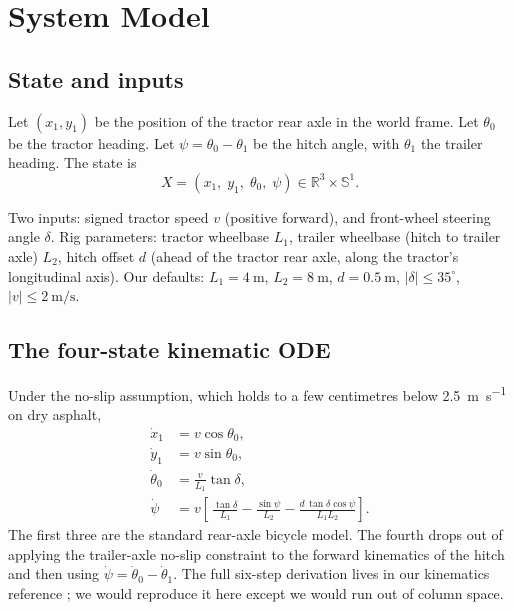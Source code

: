 \documentclass[conference]{IEEEtran}
\begin{document}
\section{System Model}
\label{sec:model}

\subsection{State and inputs}

Let $(x_1, y_1)$ be the position of the tractor rear axle in the world
frame. Let $\theta_0$ be the tractor heading. Let $\psi = \theta_0 -
\theta_1$ be the hitch angle, with $\theta_1$ the trailer heading. The
state is
\begin{equation}
    X = (x_1,\; y_1,\; \theta_0,\; \psi) \in \mathbb{R}^{3} \times \mathbb{S}^{1}.
\end{equation}

Two inputs: signed tractor speed $v$ (positive forward), and front-wheel
steering angle $\delta$. Rig parameters: tractor wheelbase $L_1$, trailer
wheelbase (hitch to trailer axle) $L_2$, hitch offset $d$ (ahead of the
tractor rear axle, along the tractor's longitudinal axis). Our defaults:
$L_1 = \SI{4}{\meter}$, $L_2 = \SI{8}{\meter}$, $d = \SI{0.5}{\meter}$,
$|\delta| \le 35^{\circ}$, $|v| \le \SI{2}{\meter\per\second}$.

\subsection{The four-state kinematic ODE}

Under the no-slip assumption, which holds to a few centimetres below
\SI{2.5}{\meter\per\second} on dry asphalt,
\begin{align}
    \dot{x}_1   &= v \cos \theta_0, \nonumber \\
    \dot{y}_1   &= v \sin \theta_0, \nonumber \\
    \dot{\theta}_0 &= \frac{v}{L_1} \tan \delta, \label{eq:ode} \\
    \dot{\psi}  &= v \left[\, \frac{\tan \delta}{L_1}
                       - \frac{\sin \psi}{L_2}
                       - \frac{d\, \tan \delta \cos \psi}{L_1 L_2} \right]. \nonumber
\end{align}
The first three are the standard rear-axle bicycle model. The fourth
drops out of applying the trailer-axle no-slip constraint to the forward
kinematics of the hitch and then using $\dot{\psi} = \dot{\theta}_0 -
\dot{\theta}_1$. The full six-step derivation lives in our kinematics
reference \cite{ReportCodeKinematics}; we would reproduce it here except
we would run out of column space.
\end{document}
